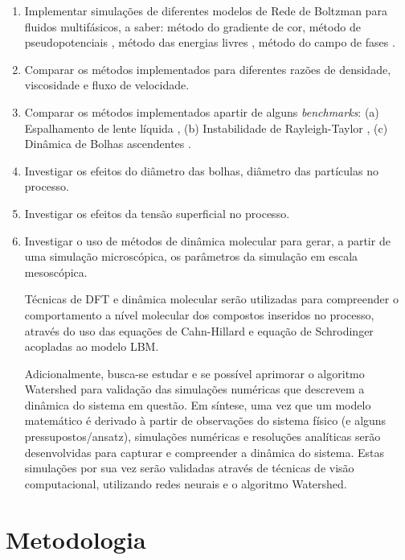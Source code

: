 \documentclass[12pt]{article}
\begin{document}
\begin{enumerate}
    \item Implementar simulações de diferentes modelos de Rede de Boltzman para fluidos multifásicos, a saber: método do gradiente de cor\cite{gunstensen1991lattice}, método de pseudopotenciais \cite{shan1993lattice}, método das energias livres \cite{swift1996lattice}, método do campo de fases \cite{he1999lattice}.
    \item Comparar os métodos implementados para diferentes razões de densidade, viscosidade e fluxo de velocidade.
    \item Comparar os métodos implementados apartir de alguns {\it benchmarks}: (a) Espalhamento de lente líquida \cite{craster2006dynamics}, (b) 
    Instabilidade de  Rayleigh-Taylor \cite{sharp1984overview}, (c) Dinâmica de Bolhas ascendentes \cite{wang2018bubble}.
    \item Investigar os efeitos do diâmetro das bolhas, diâmetro das partículas no processo.
    \item Investigar os efeitos da tensão superficial no processo.

    \item Investigar o uso de métodos de dinâmica molecular para gerar, a partir de uma simulação microscópica, os parâmetros da simulação em escala mesoscópica.

Técnicas de DFT e dinâmica molecular serão utilizadas para compreender o comportamento a nível molecular dos compostos inseridos no processo, através do uso das equações de Cahn-Hillard e equação de Schrodinger acopladas ao modelo LBM.\newline

Adicionalmente, busca-se estudar e se possível aprimorar o algoritmo Watershed \cite{peng2021bubble,jahedsaravani2017image} para validação das simulações numéricas que descrevem a dinâmica do sistema em questão. Em síntese, uma vez que um modelo matemático é derivado à partir de observações do sistema físico (e alguns pressupostos/ansatz), simulações numéricas e resoluções analíticas serão desenvolvidas para capturar e compreender a dinâmica do sistema. Estas simulações por sua vez serão validadas através de técnicas de visão computacional, utilizando redes neurais e o algoritmo Watershed.
   
\end{enumerate}

\section{Metodologia}
\end{document}

